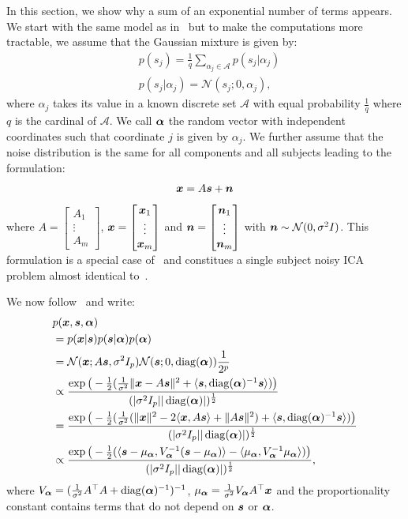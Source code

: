 In this section, we show why a sum of an exponential number of terms appears.
We start with the same model as in~\cite{guo2008unified} but to make the
computations more tractable, we assume that the Gaussian mixture is given by:
\begin{align}
  &p(s_j) = \frac1q \sum_{\alpha_j \in \mathcal{A}} p(s_j | \alpha_j) \\
  &p(s_j | \alpha_j) = \mathcal{N}( s_j; 0, \alpha_j),
\end{align}
where $\alpha_j$ takes its value in a known
discrete set $\mathcal{A}$ with equal probability $\frac1{q}$ where $q$ is the
cardinal of $\mathcal{A}$.
We call $\boldsymbol{\alpha}$ the random vector with
independent coordinates such that coordinate $j$ is given by $\alpha_j$.
We further assume that the noise distribution is the same for all components and
all subjects leading to the formulation:
\begin{align}
  \boldsymbol{x} = A \boldsymbol{s} + \boldsymbol{n}
\end{align}
where $A = \begin{bmatrix} A_1 \\ \vdots  \\ A_m \end{bmatrix}$,
$\boldsymbol{x} = \begin{bmatrix} \boldsymbol{x}_1 \\ \vdots  \\ \boldsymbol{x}_m \end{bmatrix}$ and $\boldsymbol{n}
= \begin{bmatrix} \boldsymbol{n}_1 \\ \vdots  \\ \boldsymbol{n}_m \end{bmatrix}$ with $\boldsymbol{n} \sim \mathcal{N}(0, \sigma^2 I)$.
This formulation is a special case of~\cite{guo2008unified} and constitues a single subject
noisy ICA problem almost identical to~\cite{moulines1997maximum}.

We now follow~\cite{moulines1997maximum} and write:
\begin{align}
  &p(\boldsymbol{x}, \boldsymbol{s}, \boldsymbol{\alpha}) \\
  &= p(\boldsymbol{x} | \boldsymbol{s}) p(\boldsymbol{s}|\boldsymbol{\alpha})p(\boldsymbol{\alpha}) \\
                        &= \mathcal{N}(\boldsymbol{x}; A\boldsymbol{s}, \sigma^2 I_p)\mathcal{N}( \boldsymbol{s}; 0, \operatorname*{diag}(\boldsymbol{\alpha})) \frac1{2^p} \\
  &\propto \frac{\exp\big(-\frac12(\frac1{ \sigma^2}\|\boldsymbol{x} - A\boldsymbol{s} \|^2 + \langle{ \boldsymbol{s}},{ \operatorname*{diag}(\boldsymbol{\alpha})^{-1} \boldsymbol{s}}\rangle)\big)}{(|\sigma^2 I_p| |\operatorname*{diag}(\boldsymbol{\alpha})|)^{\frac12}}  \\
  &= \frac{\exp\big(-\frac12(\frac1{ \sigma^2}(\|\boldsymbol{x} \|^2 - 2 \langle{ \boldsymbol{x}},{ A \boldsymbol{s} }\rangle + \|A \boldsymbol{s} \|^2)  + \langle{ \boldsymbol{s}},{ \operatorname*{diag}(\boldsymbol{\alpha})^{-1} \boldsymbol{s}}\rangle) \big)}{(|\sigma^2 I_p| |\operatorname*{diag}(\boldsymbol{\alpha})|)^{\frac12}} \\
  &\propto \frac{\exp\big(-\frac12( \langle{ \boldsymbol{s}- \mu_{\boldsymbol{\alpha}}},{ V_{\boldsymbol{\alpha}}^{-1} (\boldsymbol{s} - \mu_{\boldsymbol{\alpha}}) }\rangle - \langle{ \mu_{\boldsymbol{\alpha}} },{V_{\boldsymbol{\alpha}}^{-1} \mu_{\boldsymbol{\alpha}} }\rangle) \big)}{(|\sigma^2 I_p| |\operatorname*{diag}(\boldsymbol{\alpha})|)^{\frac12}},
\end{align}
where $V_{\boldsymbol{\alpha}} = (\frac1{\sigma^2}A^{\top}A + \operatorname*{diag}(\boldsymbol{\alpha})^{-1})^{-1}$, $\mu_{\boldsymbol{\alpha}} = \frac1{\sigma^2}V_{\boldsymbol{\alpha}}
A^{\top} \boldsymbol{x}$ and the proportionality constant contains terms that do not depend
on $\boldsymbol{s}$ or $\boldsymbol{\alpha}$.

